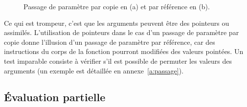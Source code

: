 \documentclass[a4paper,francais]{insalyon}
\begin{document}
\captionsetup[subfigure]{labelformat=parens}
\begin{figure}[htbp]
  \centering
   \hspace{1cm}
  \caption{Passage de paramètre par copie en (a) et par référence en (b).}  
  \label{fig:passage}
\end{figure}

Ce qui est trompeur, c'est que les arguments peuvent être des pointeurs ou assimilés. L'utilisation de pointeurs dans le cas d'un passage de paramètre par copie donne l'illusion d'un passage de paramètre par référence, car des instructions du corps de la fonction pourront modifiées des valeurs pointées. Un test imparable consiste à vérifier s'il est possible de permuter les valeurs des arguments (un exemple est détaillée en annexe~\ref{a:passage}). 

\subsection{\'Evaluation partielle}
\end{document}
